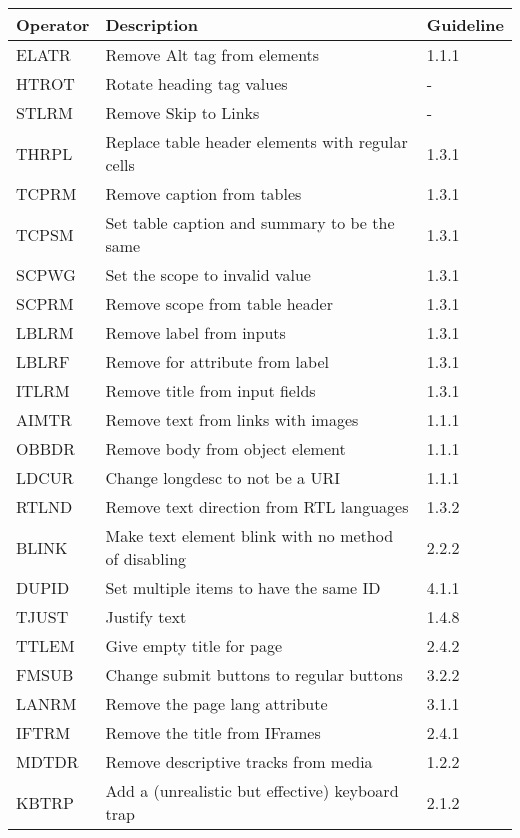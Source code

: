 \begin{tabular}{ p{}|p{}|p{} }
    \textbf{Operator} & \textbf{Description} & \textbf{Guideline} \\
        \hline
        ELATR & Remove Alt tag from elements &  1.1.1 \\
        \hline
        HTROT & Rotate heading tag values & - \\
        \hline
        STLRM & Remove Skip to Links & - \\
        \hline
        THRPL & Replace table header elements with regular cells &  1.3.1 \\
        \hline
        TCPRM & Remove caption from tables &  1.3.1 \\
        \hline
        TCPSM & Set table caption and summary to be the same &  1.3.1 \\
        \hline
        SCPWG & Set the scope to invalid value &  1.3.1 \\
        \hline
        SCPRM & Remove scope from table header &  1.3.1 \\
        \hline
        LBLRM & Remove label from inputs &  1.3.1 \\
        \hline
        LBLRF & Remove for attribute from label &  1.3.1 \\
        \hline
        ITLRM & Remove title from input fields &  1.3.1 \\
        \hline
        AIMTR & Remove text from links with images &  1.1.1 \\
        \hline
        OBBDR & Remove body from object element &  1.1.1 \\
        \hline
        LDCUR & Change longdesc to not be a URI &  1.1.1 \\
        \hline
        RTLND & Remove text direction from RTL languages &  1.3.2 \\
        \hline
        BLINK & Make text element blink with no method of disabling &  2.2.2 \\
        \hline
        DUPID & Set multiple items to have the same ID &  4.1.1 \\
        \hline
        TJUST & Justify text &  1.4.8 \\
        \hline
        TTLEM & Give empty title for page &  2.4.2 \\
        \hline
        FMSUB & Change submit buttons to regular buttons &  3.2.2 \\
        \hline
        LANRM & Remove the page lang attribute &  3.1.1 \\
        \hline
        IFTRM & Remove the title from IFrames &  2.4.1 \\
        \hline
        MDTDR & Remove descriptive tracks from media &  1.2.2 \\
        \hline
        KBTRP & Add a (unrealistic but effective) keyboard trap &  2.1.2 \\
\end{tabular}
